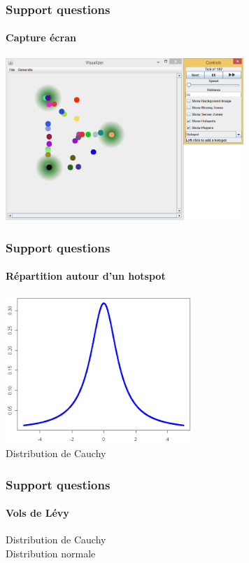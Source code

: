 \documentclass{beamer}
\begin{document}
\begin{frame}
  \frametitle{Support questions}
  \framesubtitle{Capture écran}
  \centering
  \includegraphics[width=9cm]{capture_ecran.png}
\end{frame}
\begin{frame}
  \frametitle{Support questions}
  \framesubtitle{Répartition autour d'un hotspot}
  \centering
  \includegraphics[width=7cm]{cauchy.png}\\
  Distribution de Cauchy
\end{frame}
\begin{frame}
  \frametitle{Support questions}
  \framesubtitle{Vols de Lévy}
  \centering
  \hspace{1.2cm} Distribution de Cauchy\\
  \hspace{1cm} Distribution normale
\end{frame}
\end{document}
